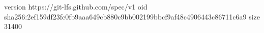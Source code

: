 version https://git-lfs.github.com/spec/v1
oid sha256:2ef159df23fc0fb9aaa649cb880c9bb002199bbcf9af48c4906443c86711c6a9
size 31400

